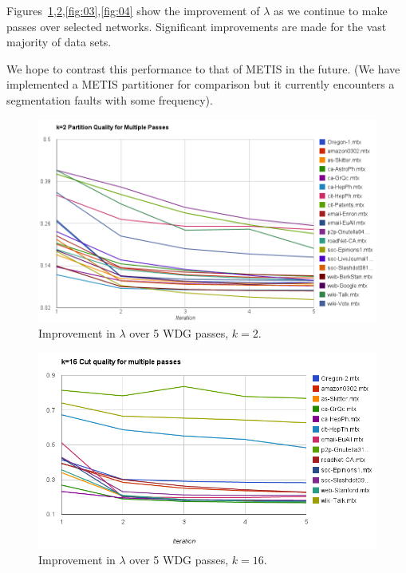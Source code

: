 Figures~\ref{fig:01},\ref{fig:02},\ref{fig:03},\ref{fig:04} show the improvement of $\lambda$ as we continue to make passes over selected networks. Significant improvements are made for the vast majority of data sets.

We hope to contrast this performance to that of METIS in the future. (We have implemented a METIS partitioner for comparison but it currently encounters a segmentation faults with some frequency). 



\begin{figure}[h!]
\centering
\includegraphics[width=0.8\columnwidth] {figures/2partlambda}
\caption[Caption for]{Improvement in $\lambda$ over 5 WDG passes, $k=2$.}
\label{fig:01}
\end{figure}

\begin{figure}[h!]
\centering
\includegraphics[width=0.8\columnwidth] {figures/16partlambda}
\caption[Caption for]{Improvement in $\lambda$ over 5 WDG passes, $k=16$.}
\label{fig:02}
\end{figure}

